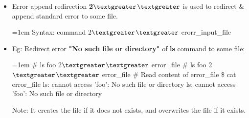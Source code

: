 \setlength{\columnsep}{3pt}
\begin{flushleft}

	\begin{itemize}
	\item Error append redirection \textbf{2{$\textgreater$}{$\textgreater$}} is used to redirect \& append standard error to some file.
	\bigskip
	\begin{tcolorbox}[breakable,notitle,boxrule=-0pt,colback=pink,colframe=pink]
		\color{black}
		\font=1em
		Syntax: command 2{$\textgreater$}{$\textgreater$} erorr\_input\_file
		\font=4pt
	\end{tcolorbox}
	\item
	Eg: Redirect error \textbf{"No such file or directory"} of \textbf{ls} command to some file:
	\bigskip
	\begin{tcolorbox}[breakable,notitle,boxrule=-0pt,colback=black,colframe=black]
		\color{green}
		\font=1em
		\# ls foo 2{$\textgreater$}{$\textgreater$} error\_file
		\newline
		\# ls foo 2{$\textgreater$}{$\textgreater$} error\_file
		\newline
		\newline
		\color{yellow}
		\# Read content of error\_file
		\color{green}
		\newline
		\$ cat error\_file
		\newline
		\color{white}
		ls: cannot access 'foo': No such file or directory
		\newline
		ls: cannot access 'foo': No such file or directory
		\font=4pt
	\end{tcolorbox}

	\bigskip
	\begin{tcolorbox}[breakable,notitle,boxrule=1pt,colback=yellow,colframe=yellow]
		\color{black}
		Note: It creates the file if it does not exists, and overwrites the file if it exists.
	\end{tcolorbox}
\end{itemize}
	

	
\end{flushleft}



\newpage